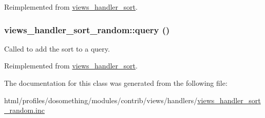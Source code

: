 Reimplemented from \hyperlink{classviews__handler__sort_aba953218e09ab9da8f6ed0a67f046455}{views\_\-handler\_\-sort}.\hypertarget{classviews__handler__sort__random_aeaf6fcc03c9d1a0f86a77b9e5314229a}{
\subsubsection[{query}]{\setlength{\rightskip}{0pt plus 5cm}views\_\-handler\_\-sort\_\-random::query ()}}
\label{classviews__handler__sort__random_aeaf6fcc03c9d1a0f86a77b9e5314229a}
Called to add the sort to a query. 

Reimplemented from \hyperlink{classviews__handler__sort_a94fa33c5d037e41a927583fce2df3d18}{views\_\-handler\_\-sort}.

The documentation for this class was generated from the following file:\begin{DoxyCompactItemize}
\item 
html/profiles/dosomething/modules/contrib/views/handlers/\hyperlink{views__handler__sort__random_8inc}{views\_\-handler\_\-sort\_\-random.inc}\end{DoxyCompactItemize}
